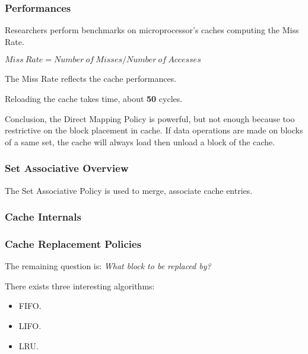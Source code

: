 \begin{frame}[containsverbatim]
  \frametitle{Performances}

  Researchers perform benchmarks on microprocessor's caches
  computing the Miss Rate.

  \-

  $Miss~Rate = Number~of~Misses / Number~of~Accesses$

  \-

  The Miss Rate reflects the cache performances.

  \-

  Reloading the cache takes time, about \textbf{50} cycles.

  \-

  Conclusion, the Direct Mapping Policy is powerful, but not enough because
  too restrictive on the block placement in cache. If data operations
  are made on blocks of a same set, the cache will always load then unload
  a block of the cache.
\end{frame}


\begin{frame}
  \frametitle{Set Associative Overview}

  The Set Associative Policy is used to merge, associate cache entries.

  \begin{center}
  \end{center}
\end{frame}


\begin{frame}
  \frametitle{Cache Internals}

  \begin{center}
  \end{center}
\end{frame}


\begin{frame}
  \frametitle{Cache Replacement Policies}

  The remaining question is: \textit{What block to be replaced by?}

  \-

  There exists three interesting algorithms:

  \begin{itemize}
    \item
      FIFO.
    \item
      LIFO.
    \item
      LRU.
  \end{itemize}
\end{frame}

